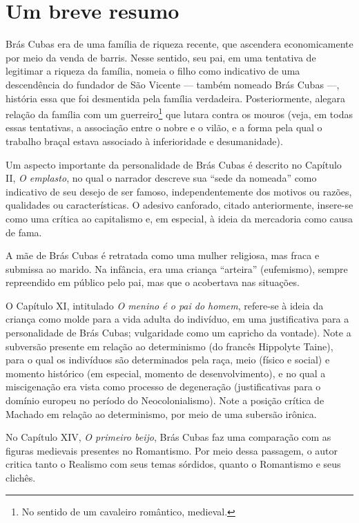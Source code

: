 \section{Um breve resumo}

Brás Cubas era de uma família de riqueza recente, que ascendera economicamente por meio da venda de barris. Nesse sentido, seu pai, em uma tentativa de legitimar a riqueza da família, nomeia o filho como indicativo de uma descendência do fundador de São Vicente — também nomeado Brás Cubas —, história essa que foi desmentida pela família verdadeira. Posteriormente, alegara relação da família com um guerreiro\footnote{No sentido de um cavaleiro romântico, medieval.} que lutara contra os mouros (veja, em todas essas tentativas, a associação entre o nobre e o vilão, e a forma pela qual o trabalho braçal estava associado à inferioridade e desumanidade).

Um aspecto importante da personalidade de Brás Cubas é descrito no Capítulo II, \textit{O emplasto}, no qual o narrador descreve sua ``sede da nomeada'' como indicativo de seu desejo de ser famoso, independentemente dos motivos ou razões, qualidades ou características. O adesivo canforado, citado anteriormente, insere-se como uma crítica ao capitalismo e, em especial, à ideia da mercadoria como causa de fama.

A mãe de Brás Cubas é retratada como uma mulher religiosa, mas fraca e submissa ao marido. Na infância, era uma criança ``arteira'' (eufemismo), sempre repreendido em público pelo pai, mas que o acobertava nas situações.

O Capítulo XI, intitulado \textit{O menino é o pai do homem}, refere-se à ideia da criança como molde para a vida adulta do indivíduo, em uma justificativa para a personalidade de Brás Cubas; vulgaridade como um capricho da vontade). Note a subversão presente em relação ao determinismo (do francês Hippolyte Taine), para o qual os indivíduos são determinados pela raça, meio (físico e social) e momento histórico (em especial, momento de desenvolvimento), e no qual a miscigenação era vista como processo de degeneração (justificativas para o domínio europeu no período do Neocolonialismo). Note a posição crítica de Machado em relação ao determinismo, por meio de uma subersão irônica.

No Capítulo XIV, \textit{O primeiro beijo}, Brás Cubas faz uma comparação com as figuras medievais presentes no Romantismo. Por meio dessa passagem, o autor critica tanto o Realismo com seus temas sórdidos, quanto o Romantismo e seus clichês.

